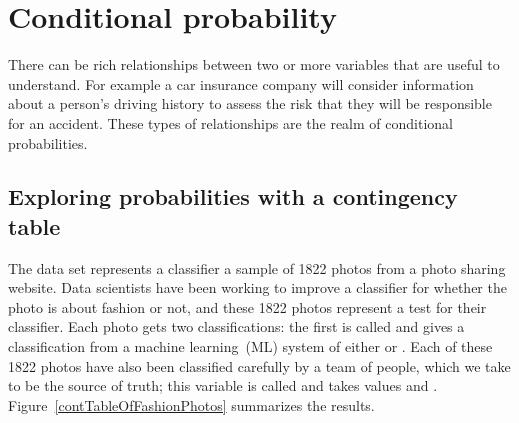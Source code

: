 \section{Conditional probability}
\label{conditionalProbabilitySection}

There can be rich relationships between two or more
variables that are useful to understand.
For example a car insurance company will consider
information about a person's driving history to assess
the risk that they will be responsible for an accident.
These types of relationships are the realm of conditional
probabilities.


\subsection{Exploring probabilities with a contingency table}


\newcommand{\fashN}{1822}
\newcommand{\fashYY}{197}
\newcommand{\fashYN}{22}
\newcommand{\fashYA}{219}
\newcommand{\fashNY}{112}
\newcommand{\fashNN}{1491}
\newcommand{\fashNA}{1603}
\newcommand{\fashAY}{309}
\newcommand{\fashAN}{1513}
\newcommand{\fashAA}{\fashN{}}
\newcommand{\fashCYPY}{0.96}
\newcommand{\fashCYPN}{0.04}
\newcommand{\fashCNPY}{0.07}
\newcommand{\fashCNPN}{0.93}

The  data set represents
a classifier a sample of \fashN{} photos from a photo sharing website.
Data scientists have been working to improve a classifier for
whether the photo is about fashion or not, and these 1822 photos
represent a test for their classifier.
Each photo gets two classifications:
the first is called  and gives
a classification from a machine
learning~(ML) system of
either  or .
Each of these \fashN{} photos have also been classified carefully
by a team of people, which we take to be the source of truth;
this variable is called  and takes values
 and .
Figure~\ref{contTableOfFashionPhotos} summarizes the results.

